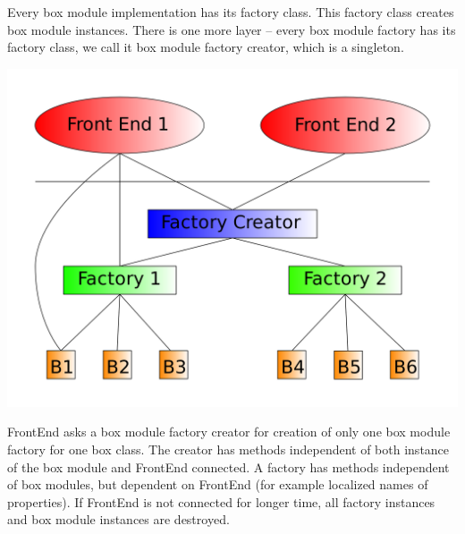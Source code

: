 \documentclass[a4paper,12pt]{book}
\begin{document}
Every box module implementation has its factory class. This factory class creates box module instances. There is one more layer -- every box module factory has its factory class, we call it box module factory creator, which is a singleton.

\noindent\includegraphics[width=13.72cm]{creatorFactory}

FrontEnd asks a box module factory creator for creation of only one box module factory for one box class. The creator has methods independent of both instance of the box module and FrontEnd connected. A factory has methods independent of box modules, but dependent on FrontEnd (for example localized names of properties). If FrontEnd is not connected for longer time, all factory instances and box module instances are destroyed.
\end{document}
